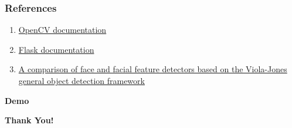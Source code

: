 \documentclass[14pt]{beamer}
\begin{document}
\begin{frame}
    \frametitle{References}
    \begin{enumerate}
        \item \href{https://opencv.org/}{OpenCV documentation} 
        \item \href{https://flask.palletsprojects.com/en/1.1.x/}{Flask documentation} 
        \item \href{http://alereimondo.no-ip.org/OpenCV/uploads/37/CameraReadyPaper63.pdf}{A comparison of face and facial feature detectors based on the Viola-Jones general object detection framework}
    \end{enumerate}
\end{frame}

\begin{frame}[c]{ }
    \centering
\huge \textbf{Demo}
\end{frame}
\begin{frame}[c]{ }
    \centering
\huge \textbf{Thank You!}
\end{frame}
\end{document}
